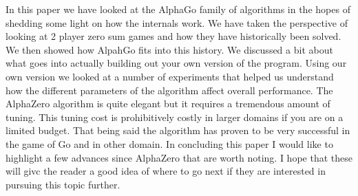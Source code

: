 
In this paper we have looked at the AlphaGo family of algorithms in the hopes of shedding some light on how the internals work. We have taken the perspective of looking at 2 player zero sum games and how they have historically been solved. We then showed how AlpahGo fits into this history. We discussed a bit about what goes into actually building out your own version of the program. Using our own version we looked at a number of experiments that helped us understand how the different parameters of the algorithm affect overall performance. The AlphaZero algorithm is quite elegant but it requires a tremendous amount of tuning. This tuning cost is prohibitively costly in larger domains if you are on a limited budget. That being said the algorithm has proven to be very successful in the game of Go and in other domain. In concluding this paper I would like to highlight a few advances since AlphaZero that are worth noting. I hope that these will givc the reader a good idea of where to go next if they are interested in pursuing this topic further.

